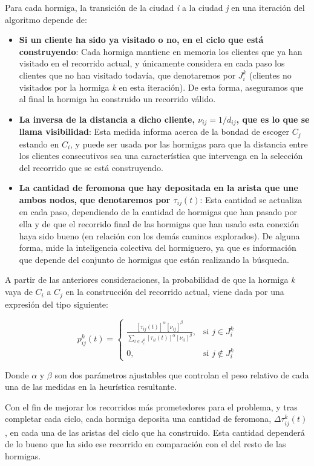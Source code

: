 \documentclass[twocolumn, fontsize=10pt]{article}
\theoremstyle{definition} %
\begin{document}
Para cada hormiga, la transición de la ciudad \textit{i} a la ciudad \textit{j} en una iteración del algoritmo depende de:
\begin{itemize}
    \item \textbf{Si un cliente ha sido ya visitado o no, en el ciclo que está construyendo}: Cada hormiga mantiene en memoria los clientes que ya han visitado en el recorrido actual, y únicamente considera en cada paso los clientes que no han visitado todavía, que denotaremos por $J_i^k$ (clientes no visitados por la hormiga \textit{k} en esta iteración). De esta forma, aseguramos que al final la hormiga ha 
    construido un recorrido válido.
    \item \textbf{La inversa de la distancia a dicho cliente, \(\nu_{ij} = 1/d_{ij}\), que es lo que se llama visibilidad}: Esta medida informa acerca de la bondad de escoger \( C_j \) estando en \( C_i \), y puede ser usada por las hormigas para que la distancia entre los clientes consecutivos sea una característica que intervenga en la selección del recorrido que se está construyendo.
    \item \textbf{La cantidad de feromona que hay depositada en la arista que une ambos nodos, que denotaremos por \(\tau_{ij}(t)\)}: Esta cantidad se actualiza en cada paso, dependiendo de la cantidad de hormigas que han pasado por ella y de que el recorrido final de las hormigas que han usado esta conexión haya sido bueno (en relación con los demás caminos explorados). De alguna forma, mide la inteligencia colectiva del hormiguero, ya que es información que depende del conjunto de hormigas que están realizando la búsqueda.
\end{itemize}

A partir de las anteriores consideraciones, la probabilidad de que la hormiga \textit{k} vaya de \(C_i\) a \(C_j\) en la construcción del recorrido actual, viene dada por una expresión del tipo siguiente:

\[
p_{ij}^k(t) =
\begin{cases}
\frac{[\tau_{ij}(t)]^\alpha [\nu_{ij}]^\beta}{\sum\limits_{l \in J_i^k} [\tau_{il}(t)]^\alpha [\nu_{il}]^\beta}, & \text{si } j \in J_i^k \\[10pt]
0, & \text{si } j \notin J_i^k
\end{cases}
\]

Donde \(\alpha\) y \(\beta\) son dos parámetros ajustables que controlan el peso relativo de cada una de las medidas en la heurística resultante.

Con el fin de mejorar los recorridos más prometedores para el problema, y tras completar cada ciclo, cada hormiga deposita una cantidad de feromona, \(\Delta \tau_{ij}^k(t)\), en cada una de las aristas del ciclo que ha construido. Esta cantidad dependerá de lo bueno que ha sido ese recorrido en comparación con el del resto de las hormigas.
\end{document}
